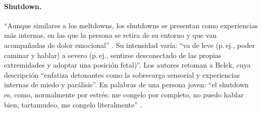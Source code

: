 \paragraph{Shutdown.} \enquote{Aunque similares a los meltdowns, los shutdowns se presentan como experiencias más internas, en las que la persona se retira de su entorno y que van acompañadas de dolor emocional} \citep{phung2021}. Su intensidad varía: \enquote{va de leve (p.\,ej., poder caminar y hablar) a severo (p.\,ej., sentirse desconectado de las propias extremidades y adoptar una posición fetal)}. Los autores retoman a Belek, cuya descripción \enquote{enfatiza detonantes como la sobrecarga sensorial y experiencias internas de miedo y parálisis}. En palabras de una persona joven: \enquote{el shutdown es, como, normalmente por estrés: me congelo por completo, no puedo hablar bien, tartamudeo, me congelo literalmente} \citep{phung2021}.
